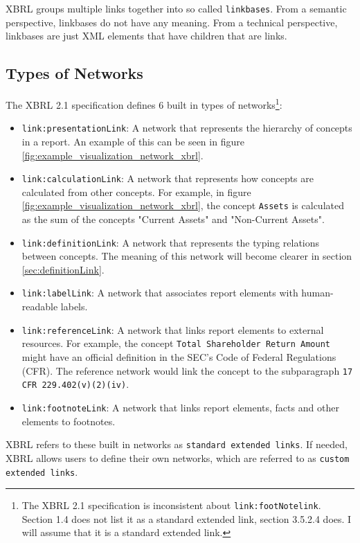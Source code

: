 XBRL groups multiple links together into so called \texttt{linkbases}.
From a semantic perspective, linkbases do not have any meaning.
From a technical perspective, linkbases are just XML elements that have children that are links. 

\subsection{Types of Networks}

The XBRL 2.1 specification defines 6 built in types of networks\cite{xbrl21_terminology}\footnote{The XBRL 2.1 specification is inconsistent about \texttt{link:footNotelink}. Section 1.4 does not list it as a standard extended link, section 3.5.2.4 does. I will assume that it is a standard extended link.}:

\begin{itemize}
    \item \texttt{link:presentationLink}: A network that represents the hierarchy of concepts in a report. An example of this can be seen in figure \ref{fig:example_visualization_network_xbrl}.
    \item \texttt{link:calculationLink}: A network that represents how concepts are calculated from other concepts. 
    For example, in figure \ref{fig:example_visualization_network_xbrl}, the concept \texttt{Assets} is calculated as the sum of the concepts "Current Assets" and "Non-Current Assets".
    \item \texttt{link:definitionLink}: A network that represents the typing relations between concepts.
    The meaning of this network will become clearer in section \ref{sec:definitionLink}.
    \item \texttt{link:labelLink}: A network that associates report elements with human-readable labels.
    \item \texttt{link:referenceLink}: A network that links report elements to external resources. 
    For example, the concept \texttt{Total Shareholder Return Amount} might have an official definition in the SEC's Code of Federal Regulations (CFR).
    The reference network would link the concept to the subparagraph \texttt{17 CFR 229.402(v)(2)(iv)}\cite{cfr_total_shareholder_return_amount}.
    \item \texttt{link:footnoteLink}: A network that links report elements, facts and other elements to footnotes.
\end{itemize}

XBRL refers to these built in networks as \texttt{standard extended links}. 
If needed, XBRL allows users to define their own networks, which are referred to as \texttt{custom extended links}\cite{xbrl21_terminology}.

